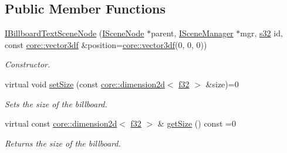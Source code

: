 \subsection*{Public Member Functions}
\begin{DoxyCompactItemize}
\item 
\mbox{\label{classirr_1_1scene_1_1IBillboardTextSceneNode_a758a6a0ec2f76ee7623f19a55f1e7c4b}} 
\hyperlink{classirr_1_1scene_1_1IBillboardTextSceneNode_a758a6a0ec2f76ee7623f19a55f1e7c4b}{I\+Billboard\+Text\+Scene\+Node} (\hyperlink{classirr_1_1scene_1_1ISceneNode}{I\+Scene\+Node} $\ast$parent, \hyperlink{classirr_1_1scene_1_1ISceneManager}{I\+Scene\+Manager} $\ast$mgr, \hyperlink{namespaceirr_ac66849b7a6ed16e30ebede579f9b47c6}{s32} id, const \hyperlink{namespaceirr_1_1core_a06f169d08b5c429f5575acb7edbad811}{core\+::vector3df} \&position=\hyperlink{namespaceirr_1_1core_a06f169d08b5c429f5575acb7edbad811}{core\+::vector3df}(0, 0, 0))
\begin{DoxyCompactList}\small\item\em Constructor. \end{DoxyCompactList}\item 
\mbox{\label{classirr_1_1scene_1_1IBillboardTextSceneNode_a506ca9b0ef160993fc44f4e0b5b97b63}} 
virtual void \hyperlink{classirr_1_1scene_1_1IBillboardTextSceneNode_a506ca9b0ef160993fc44f4e0b5b97b63}{set\+Size} (const \hyperlink{classirr_1_1core_1_1dimension2d}{core\+::dimension2d}$<$ \hyperlink{namespaceirr_a0277be98d67dc26ff93b1a6a1d086b07}{f32} $>$ \&size)=0
\begin{DoxyCompactList}\small\item\em Sets the size of the billboard. \end{DoxyCompactList}\item 
\mbox{\label{classirr_1_1scene_1_1IBillboardTextSceneNode_aead5178207d887357fb7f3fbddcc51d6}} 
virtual const \hyperlink{classirr_1_1core_1_1dimension2d}{core\+::dimension2d}$<$ \hyperlink{namespaceirr_a0277be98d67dc26ff93b1a6a1d086b07}{f32} $>$ \& \hyperlink{classirr_1_1scene_1_1IBillboardTextSceneNode_aead5178207d887357fb7f3fbddcc51d6}{get\+Size} () const =0
\begin{DoxyCompactList}\small\item\em Returns the size of the billboard. \end{DoxyCompactList}\item 

\end{DoxyCompactItemize}
